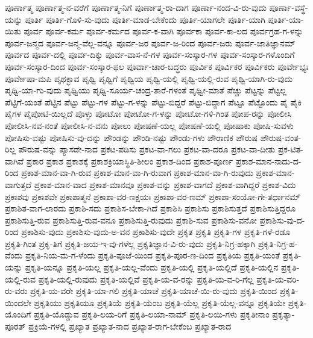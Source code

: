 {ಪೂರ್ಣಾತ್ಮ
ಪೂರ್ಣಾತ್ಮ-ನ-ವರೆಗೆ
ಪೂರ್ಣಾತ್ಮ-ನಿಗೆ
ಪೂರ್ಣಾತ್ಮ-ರಾ-ದಾಗ
ಪೂರ್ಣಾ-ನಂದ-ವಿ-ರು-ವುದು
ಪೂರ್ಣಾ-ವಸ್ಥೆ-ಯನ್ನು
ಪೂರ್ತಿ
ಪೂರ್ತಿ-ಗೊಳಿ-ಸು-ವುದು
ಪೂರ್ತಿ-ಮಾಡ-ಬೇಕೆಂದು
ಪೂರ್ತಿ-ಯಾಗಲೇ
ಪೂರ್ತಿ-ಯಾಗಿ
ಪೂರ್ತಿ-ಯಾ-ಯಿತು
ಪೂರ್ವ
ಪೂರ್ವ-ಕರ್ಮ
ಪೂರ್ವ-ಕರ್ಮದ
ಪೂರ್ವ-ಕ-ವಾಗಿ
ಪೂರ್ವಕಾ
ಪೂರ್ವ-ಕಾ-ಲದ
ಪೂರ್ವಗ್ರಹ-ಗ-ಳನ್ನು
ಪೂರ್ವ-ಜನ್ಮದ
ಪೂರ್ವ-ಜನ್ಮ-ವೆಲ್ಲ-ವನ್ನೂ
ಪೂರ್ವ-ಜರ
ಪೂರ್ವ-ಜ-ರಿಂದ
ಪೂರ್ವ-ಜರು
ಪೂರ್ವ-ಜಾತಿಜ್ಞಾನಮ್
ಪೂರ್ವದ
ಪೂರ್ವ-ದಲ್ಲಿ
ಪೂರ್ವ-ದಿಕ್ಕು
ಪೂರ್ವ-ವಾಸ-ನೆ-ಗಳ
ಪೂರ್ವ-ಸಂಸ್ಕಾರ-ಗಳ
ಪೂರ್ವ-ಸಂಸ್ಕಾರ-ಗಳೊಂದಿಗೆ
ಪೂರ್ವ-ಸಂಸ್ಕಾರ-ದಿಂದ
ಪೂರ್ವ-ಸಂಸ್ಕಾರ-ಫಲ
ಪೂರ್ವಾ-ಚಾರ-ಬದ್ಧರು
ಪೂರ್ವಿಕ
ಪೂರ್ವಿಕರ
ಪೂರ್ವಿಕರು
ಪೂರ್ವೇಭ್ಯಃ
ಪೂರ್ವೇಷಾ-ಮಪಿ
ಪೃಥಕ್ಭಾವ
ಪೃಥ್ವಿ
ಪೃಥ್ವಿಗೆ
ಪೃಥ್ವಿಯ
ಪೃಥ್ವಿ-ಯಲ್ಲಿ
ಪೃಥ್ವಿ-ಯಲ್ಲಿ-ರುವ
ಪೃಥ್ವಿ-ಯಾಗಿ-ರು-ವುದು
ಪೃಥ್ವಿ-ಯಾ-ಗು-ವುದು
ಪೃಥ್ವಿಯು
ಪೃಥ್ವಿ-ಸೂರ್ಯ-ಚಂದ್ರ-ತಾರೆ-ಗಳಂತೆ
ಪೃಥ್ವೀ-ಮಾತೆ
ಪೆಚ್ಚು
ಪೆಟ್ಟನ್ನು
ಪೆಟ್ಟಲ್ಲ
ಪೆಟ್ಟಿಗೆ-ಯಂತೆ
ಪೆಟ್ಟಿನ
ಪೆಟ್ಟು
ಪೆಟ್ಟು-ಗಳ
ಪೆಟ್ಟು-ಗ-ಳನ್ನು
ಪೆಟ್ಟು-ಬಿದ್ದರೆ
ಪೆಟ್ಟು-ಬಿದ್ದಾಗ
ಪೆಟ್ಟೂ
ಪೆಟ್ಟೊಂದು
ಪೈ
ಪೈಕಿ
ಪೈಗಳ
ಪೈಪೋಟಿ-ಯಿಲ್ಲದೆ
ಪೊಳ್ಳು
ಪೋಟೋ
ಪೋಟೋ-ಗ-ಳನ್ನು
ಪೋಟೋ-ಗಳಿ-ಗಿಂತ
ಪೋಪ-ರನ್ನು
ಪೋಲೀಸಿ
ಪೋಲೀಸಿ-ನವ-ನಂತೆ
ಪೋಲೀಸಿ-ನ-ವನು
ಪೋಲು
ಪೋಷಣೆ-ಯಲ್ಲ
ಪೋಷಣೆ-ಯಲ್ಲಿ
ಪೋಷಾಕು
ಪೋಷಿ-ಸುವಳು
ಪೋಷಿಸು-ವಷ್ಟು
ಪೋಷಿಸು-ವು-ದನ್ನು
ಪೌಂಡನ್ನು
ಪೌಂಡಿ-ನಷ್ಟು
ಪೌಂಡು-ಗಳು
ಪೌರಾಣಿಕ
ಪೌರುಷ
ಪೌರುಷ-ವಂತ-ರಿಲ್ಲ
ಪೌರುಷ-ವನ್ನು
ಪ್ಯಾಸಡೇ-ನಾದ
ಪ್ರಕಟ-ಪಡಿಸು
ಪ್ರಕಟ-ವಾ-ಗಲು
ಪ್ರಕಟ-ವಾ-ದರೂ
ಪ್ರಕಟ-ವಾ-ದೀತು
ಪ್ರಕ-ಟಿತ-ವಾಗಿವೆ
ಪ್ರಕಾರ
ಪ್ರಕಾಶ
ಪ್ರಕಾಶಕ್ಕೆ
ಪ್ರಕಾಶಕ್ರಿಯಾಸ್ಥಿತಿ-ಶೀಲಂ
ಪ್ರಕಾಶ-ದಿಂದ
ಪ್ರಕಾಶ-ಪೂರ್ಣ
ಪ್ರಕಾಶ-ಮಾನ-ನಾದು-ದ-ರಿಂದ
ಪ್ರಕಾಶ-ಮಾನ-ವಾ-ಗಿ-ರುವ
ಪ್ರಕಾಶ-ಮಾನ-ವಾ-ಗಿ-ರುವಾಗ
ಪ್ರಕಾಶ-ಮಾನ-ವಾ-ಗಿ-ರುವುದು
ಪ್ರಕಾಶ-ಮಾನ-ವಾಗುತ್ತದೆ
ಪ್ರಕಾಶ-ಮಾನ-ವಾದ
ಪ್ರಕಾಶ-ಮಾನವೂ
ಪ್ರಕಾಶ-ವನ್ನು
ಪ್ರಕಾಶ-ವಾಗದೆ
ಪ್ರಕಾಶ-ವಾಗಿದ್ದರೆ
ಪ್ರಕಾಶ-ವಿದು
ಪ್ರಕಾಶವು
ಪ್ರಕಾಶವೇ
ಪ್ರಕಾಶಾತ್ಮನೆ
ಪ್ರಕಾಶಾ-ವರ-ಣಕ್ಷಯಃ
ಪ್ರಕಾಶಾ-ವರ-ಣಮ್
ಪ್ರಕಾಶಾ-ಸಂಯೋ-ಗೇ-ತರ್ಧಾನಮ್
ಪ್ರಕಾಶಿತ-ವಾಗ-ಲಾರದು
ಪ್ರಕಾಶಿ-ಸದು
ಪ್ರಕಾಶಿಸ-ಬೇಕಾ-ಗಿದೆ
ಪ್ರಕಾಶಿಸಿ
ಪ್ರಕಾಶಿಸು
ಪ್ರಕಾಶಿಸುತ್ತದೆ
ಪ್ರಕಾಶಿಸುತ್ತಿದ್ದರೂ
ಪ್ರಕಾಶಿಸುತ್ತಿ-ರುವ
ಪ್ರಕಾಶಿಸುತ್ತಿ-ರುವ-ವನೂ
ಪ್ರಕಾಶಿಸುತ್ತಿ-ರುವುದು
ಪ್ರಕಾಶಿ-ಸುವ
ಪ್ರಕಾಶಿಸು-ವನೋ
ಪ್ರಕಾಶಿಸು-ವು-ದ-ರಿಂದ
ಪ್ರಕಾಶಿಸು-ವುದು
ಪ್ರಕಾಶಿಸು-ವುದು-ಅ-ವನ
ಪ್ರಕಾಶಿಸು-ವುದೇ
ಪ್ರಕೃತ
ಪ್ರಕೃತಿ
ಪ್ರಕೃತಿ-ಗಳ
ಪ್ರಕೃತಿ-ಗಳೆ-ರಡೂ
ಪ್ರಕೃತಿ-ಗಿಂತ
ಪ್ರಕೃ-ತಿಗೆ
ಪ್ರಕೃತಿ-ಜಯ-ಇ-ವು-ಗಳೆಲ್ಲ
ಪ್ರಕೃತಿಜ್ಞಾನ-ವಿ-ರು-ವುದು
ಪ್ರಕೃತಿ-ನಿಗ್ರ-ಹಕ್ಕಾಗಿ
ಪ್ರಕೃತಿ-ನಿಗ್ರ-ಹ-ವೆಂದು
ಪ್ರಕೃತಿ-ನಿಯ-ಮ-ಗ-ಳೆಂದು
ಪ್ರಕೃತಿ-ಪೂಜೆ-ಯಿಂದ
ಪ್ರಕೃತಿ-ಪೂರ-ಣ-ದಿಂದ
ಪ್ರಕೃತಿಯ
ಪ್ರಕೃತಿ-ಯಂತೆ
ಪ್ರಕೃತಿ-ಯನ್ನು
ಪ್ರಕೃತಿ-ಯನ್ನೂ
ಪ್ರಕೃತಿ-ಯಲ್ಲ
ಪ್ರಕೃತಿ-ಯಲ್ಲ-ವೆಂದು
ಪ್ರಕೃತಿ-ಯಲ್ಲಿ
ಪ್ರಕೃತಿ-ಯಲ್ಲಿದೆ
ಪ್ರಕೃತಿ-ಯಲ್ಲಿನ
ಪ್ರಕೃತಿ-ಯಲ್ಲಿ-ರುವ
ಪ್ರಕೃತಿ-ಯಲ್ಲಿ-ರುವುದು
ಪ್ರಕೃತಿ-ಯಲ್ಲಿವೆ
ಪ್ರಕೃತಿ-ಯ-ವ-ರನ್ನು
ಪ್ರಕೃತಿ-ಯ-ವ-ರಿ-ಗೆಲ್ಲ
ಪ್ರಕೃತಿ-ಯ-ವರಿ-ರು-ವರು
ಪ್ರಕೃತಿ-ಯ-ವರೇ
ಪ್ರಕೃತಿ-ಯಾ-ಗಲಿ
ಪ್ರಕೃತಿ-ಯಾಚೆ
ಪ್ರಕೃತಿ-ಯಾಚೆ-ಯಿ-ರು-ವುದು
ಪ್ರಕೃತಿ-ಯಿಂದ
ಪ್ರಕೃತಿ-ಯಿಂದಲೇ
ಪ್ರಕೃತಿಯು
ಪ್ರಕೃತಿಯೂ
ಪ್ರಕೃತಿಯೆ
ಪ್ರಕೃತಿ-ಯೆಂಬ
ಪ್ರಕೃತಿ-ಯೆಲ್ಲ
ಪ್ರಕೃತಿ-ಯೆಲ್ಲ-ವನ್ನೂ
ಪ್ರಕೃತಿಯೇ
ಪ್ರಕೃತಿ-ಯೊಂದಿಗೆ
ಪ್ರಕೃತಿ-ಯೊಡ್ಡುವ
ಪ್ರಕೃತಿ-ಲಯ-ರಿಗೆ
ಪ್ರಕೃತಿ-ಲಯಾ-ನಾಮ್
ಪ್ರಕೃತಿ-ಲಯಿ-ಗಳು
ಪ್ರಕೃತೀನಾಂ
ಪ್ರಕೃತ್ಯಾ-ಪೂರತ್
ಪ್ರಕ್ರಿಯೆ-ಗಳಲ್ಲಿ
ಪ್ರಖ್ಯಾತ
ಪ್ರಖ್ಯಾತ-ನಾದ
ಪ್ರಖ್ಯಾತ-ರಾಗ-ಬೇಕೆಂಬ
ಪ್ರಖ್ಯಾತ-ರಾದ
}
